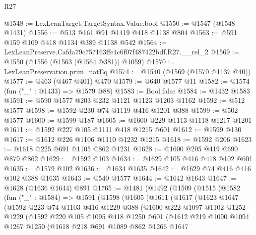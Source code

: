 \begin{lexlean}{R27}
\begin{coremodule}
@1548 := LexLeanTarget.TargetSyntax.Value.bool
@1550 := @1547 (@1548 @1431)
@1556 := @513 @161 @91 @1419 @418 @1138 @804
@1563 := @591 @159 @109 @418 @1134 @389 @1138 @542
@1564 := LexLeanPreserve.Cafda79c757163ffe4c6f07f487422bdf.R27.__rel_2
@1569 := @1550 (@1556 (@1563 (@1564 @381)) @1059)
@1570 := LexLeanPreservation.prim_natEq
@1574 := @1540 (@1569 (@1570 @1137 @40))
@1577 := @463 (@467 @401) @470
@1579 := @640 @1577 @11
@1582 := @1574 (fun ("_" : @1433) => @1579 @88)
@1583 := Bool.false
@1584 := @1432 @1583
@1591 := @590 @1577 @203 @232 @1121 @1123 @1203 @1162
@1592 := @512 @1577
@1598 := @1592 @230 @74 @1119 @416 @1201 @388
@1599 := @502 @1577
@1600 := @1599 @187
@1605 := @1600 @229 @1113 @1118 @1217 @1201
@1611 := @1592 @227 @105 @1111 @418 @1215 @601
@1612 := @1599 @130
@1617 := @1612 @226 @1106 @1110 @1232 @1215
@1618 := @1592 @206
@1623 := @1618 @225 @691 @1105 @862 @1231
@1628 := @1600 @205 @419 @690 @879 @862
@1629 := @1592 @103
@1634 := @1629 @105 @416 @418 @102 @601
@1635 := @1579 @102
@1636 := @1634 @1635
@1642 := @1629 @74 @416 @416 @102 @388 @1635
@1643 := @540 @1577
@1644 := @1642 @1643
@1647 := @1628 (@1636 @1644) @891
@1765 := @1481
    (@1492
      (@1509
        (@1515
          (@1582
            (fun ("_" : @1584) =>
            @1591
              (@1598
                (@1605
                  (@1611
                    (@1617
                      (@1623
                        @1647
                        (@1592
                          @223
                          @74
                          @1103
                          @416
                          @1229
                          @388
                          (@1600
                            @222
                            @1097
                            @1102
                            @1252
                            @1229
                            (@1592
                              @220
                              @105
                              @1095
                              @418
                              @1250
                              @601
                              (@1612
                                @219
                                @1090
                                @1094
                                @1267
                                @1250
                                (@1618
                                  @218
                                  @691
                                  @1089
                                  @862
                                  @1266
                                  @1647

\end{coremodule}
\end{lexlean}
